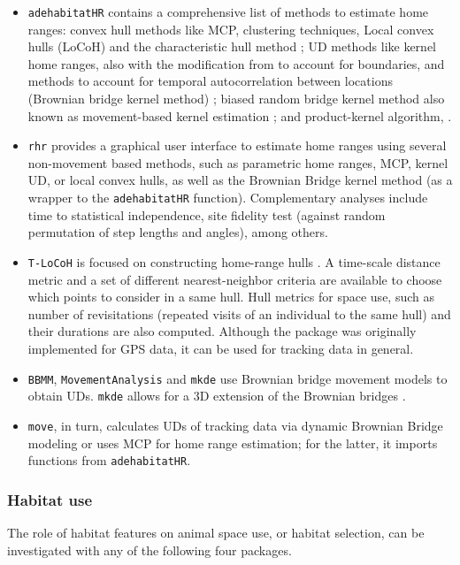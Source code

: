 \documentclass[a4paper,12pt]{article}
\newcommand{\Rpkg}[1]{\texttt{#1}}
\begin{document}
\begin{itemize}
	\item \Rpkg{adehabitatHR} contains a comprehensive list of methods to estimate home ranges: convex hull methods like MCP, clustering techniques, Local convex hulls (LoCoH) \citep{Getz2007} and the characteristic hull method \cite{Downs2009}; UD methods like kernel home ranges, also with the modification from \cite{Benhamou2010} to account for boundaries, and methods to account for temporal autocorrelation between locations (Brownian bridge kernel method) \citep{Bullard1991}; biased random bridge kernel method also known as movement-based kernel estimation \citep{Benhamou2010, Benhamou2011}; and product-kernel algorithm, \cite{Horne2007}.
	\item \Rpkg{rhr} \citep{Signer2015} provides a graphical user interface to estimate home ranges using several non-movement based methods, such as parametric home ranges, MCP, kernel UD, or local convex hulls, as well as the Brownian Bridge kernel method (as a wrapper to the \Rpkg{adehabitatHR} function). Complementary analyses include time to statistical independence, site fidelity test (against random permutation of step lengths and angles), among others.
	\item \Rpkg{T-LoCoH} is focused on constructing home-range hulls \citep{Lyons2013}. A time-scale distance metric and a set of different nearest-neighbor criteria are available to choose which points to consider in a same hull. Hull metrics for space use, such as number of revisitations (repeated visits of an individual to the same hull) and their durations are also computed. Although the package was originally implemented for GPS data, it can be used for tracking data in general. 
	\item \Rpkg{BBMM}, \Rpkg{MovementAnalysis} and \Rpkg{mkde} use Brownian bridge movement models to obtain UDs. \Rpkg{mkde} allows for a 3D extension of the Brownian bridges \citep{Tracey2014}.
	\item \Rpkg{move}, in turn, calculates UDs of tracking data via dynamic Brownian Bridge modeling \citep{Kranstauber2012} or uses MCP for home range estimation; for the latter, it imports functions from \Rpkg{adehabitatHR}.
\end{itemize}

\subsubsection*{Habitat use}

The role of habitat features on animal space use, or habitat selection, can be investigated with any of the following four packages. 
\end{document}
